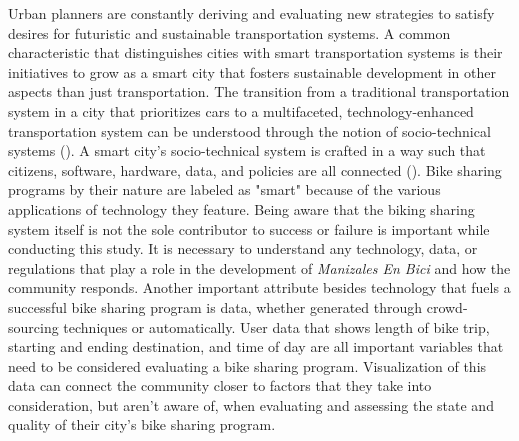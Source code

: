 \documentclass[12pt]{article}
\begin{document}
Urban planners are constantly deriving and evaluating new strategies to satisfy desires for futuristic and sustainable transportation systems. A common characteristic that distinguishes cities with smart transportation systems is their initiatives to grow as a smart city that fosters sustainable development in other aspects than just transportation. The transition from a traditional transportation system in a city that prioritizes cars to a multifaceted, technology-enhanced transportation system can be understood through the notion of socio-technical systems (\cite{SmartTransportation}). A smart city's socio-technical system is crafted in a way such that citizens, software, hardware, data, and policies are all connected (\cite{rangwala_2018}). Bike sharing programs by their nature are labeled as "smart" because of the various applications of technology they feature. Being aware that the biking sharing system itself is not the sole contributor to success or failure is important while conducting this study. It is necessary to understand any technology, data, or regulations that play a role in the development of \textit{Manizales En Bici} and how the community responds. Another important attribute besides technology that fuels a successful bike sharing program is data, whether generated through crowd-sourcing techniques or automatically. User data that shows length of bike trip, starting and ending destination, and time of day are all important variables that need to be considered evaluating a bike sharing program. Visualization of this data can connect the community closer to factors that they take into consideration, but aren't aware of, when evaluating and assessing the state and quality of their city's bike sharing program.
\end{document}
